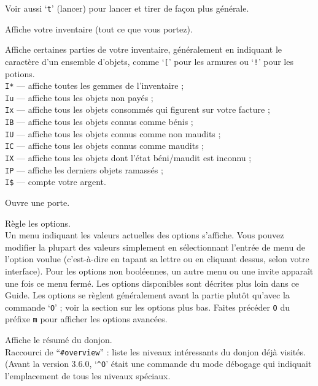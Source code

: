 \documentclass[titlepage]{article}
\begin{document}
\begin{description}[font=\mdseries\ttfamily]
Voir aussi `\texttt{t}' (lancer) pour lancer et tirer de façon plus générale.
\item[i]
Affiche votre inventaire (tout ce que vous portez).
\item[I]
Affiche certaines parties de votre inventaire, généralement en indiquant le
caractère d'un ensemble d'objets, comme `\texttt{[}' pour les armures ou `\texttt{!}'
pour les potions.\\
\texttt{I*} --- affiche toutes les gemmes de l'inventaire ;\\
\texttt{Iu} --- affiche tous les objets non payés ;\\
\texttt{Ix} --- affiche tous les objets consommés qui figurent sur votre facture ;\\
\texttt{IB} --- affiche tous les objets connus comme bénis ;\\
\texttt{IU} --- affiche tous les objets connus comme non maudits ;\\
\texttt{IC} --- affiche tous les objets connus comme maudits ;\\
\texttt{IX} --- affiche tous les objets dont l'état béni/maudit est inconnu ;\\
\texttt{IP} --- affiche les derniers objets ramassés ;\\
\texttt{I\$} --- compte votre argent.
\item[o]
Ouvre une porte.
\item[O]
Règle les options.\\
Un menu indiquant les valeurs actuelles des options
s'affiche.  Vous pouvez modifier la plupart des valeurs simplement en sélectionnant
l'entrée de menu de l'option voulue (c'est-à-dire en tapant sa lettre ou en
cliquant dessus, selon votre interface).  Pour les options non booléennes,
un autre menu ou une invite apparaît une fois ce menu fermé.
Les options disponibles
sont décrites plus loin dans ce Guide.  Les options se règlent généralement avant la
partie plutôt qu'avec la commande `\texttt{O}' ; voir la section sur les options plus bas.
Faites précéder \texttt{O} du préfixe \texttt{m} pour afficher les options avancées.
\item[\textasciicircum O]
Affiche le résumé du donjon.\\
Raccourci de ``\texttt{\#overview}'' :
liste les niveaux intéressants du donjon déjà visités.\\
(Avant la version 3.6.0, `\texttt{\textasciicircum O}' était une commande du mode débogage qui
indiquait l'emplacement de tous les niveaux spéciaux.

\end{description}
\end{document}
